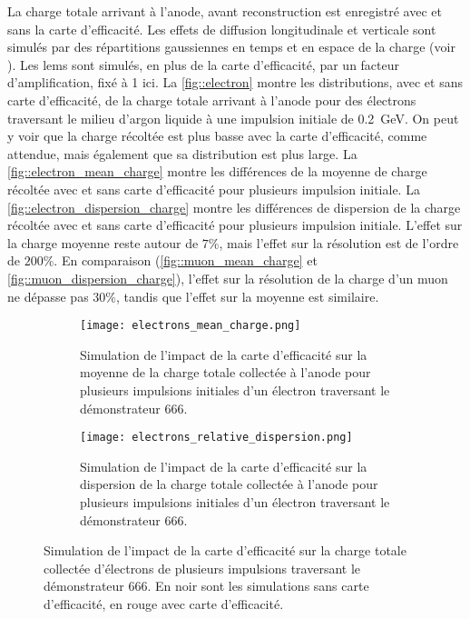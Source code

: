             La charge totale arrivant à l'anode, avant reconstruction est enregistré avec et sans la carte d'efficacité. Les effets de diffusion longitudinale et verticale sont simulés par des répartitions gaussiennes en temps et en espace de la charge (voir \cite{Agostino2014}). Les \glspl{lem} sont simulés, en plus de la carte d'efficacité, par un facteur d'amplification, fixé à 1 ici. La \autoref{fig::electron} montre les distributions, avec et sans carte d'efficacité, de la charge totale arrivant à l'anode pour des électrons traversant le milieu d'argon liquide à une impulsion initiale de \SI{0.2}{\giga\electronvolt}. On peut y voir que la charge récoltée est plus basse avec la carte d'efficacité, comme attendue, mais également que sa distribution est plus large. La \autoref{fig::electron_mean_charge} montre les différences de la moyenne de charge récoltée avec et sans carte d'efficacité pour plusieurs impulsion initiale.  La \autoref{fig::electron_dispersion_charge} montre les différences de dispersion de la charge récoltée avec et sans carte d'efficacité pour plusieurs impulsion initiale. L'effet sur la charge moyenne reste autour de $7\%$, mais l'effet sur la résolution est de l'ordre de $200\%$. En comparaison (\autoref{fig::muon_mean_charge} et \autoref{fig::muon_dispersion_charge}), l'effet sur la résolution de la charge d'un muon ne dépasse pas $30\%$, tandis que l'effet sur la moyenne est similaire.
            
            \begin{figure}[htbp]
                \begin{subfigure}[t]{0.48\textwidth}
                    \texttt{[image: electrons\_mean\_charge.png]}
                    \caption{Simulation de l'impact de la carte d'efficacité sur la moyenne de la charge totale collectée à l'anode pour plusieurs impulsions initiales d'un électron traversant le démonstrateur 666.}
                    \label{fig::electron_mean_charge}
                \end{subfigure}
                \hfill
                \begin{subfigure}[t]{0.48\textwidth}
                    \texttt{[image: electrons\_relative\_dispersion.png]}
                    \caption{Simulation de l'impact de la carte d'efficacité sur la dispersion de la charge totale collectée à l'anode pour plusieurs impulsions initiales d'un électron traversant le démonstrateur 666.}
                    \label{fig::electron_dispersion_charge}
                \end{subfigure}
                \caption[Simulation de l'impact de la carte d'efficacité sur la charge totale collectée d'électrons de plusieurs impulsions.]{Simulation de l'impact de la carte d'efficacité sur la charge totale collectée d'électrons de plusieurs impulsions traversant le démonstrateur 666. En noir sont les simulations sans carte d'efficacité, en rouge avec carte d'efficacité.}
            \end{figure}
            
